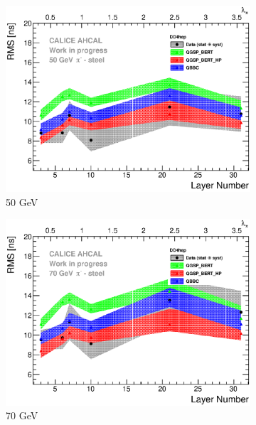 \begin{figure}[htbp!]
  \hfill
  \begin{subfigure}[t]{0.49\textwidth}
    \centering
    \includegraphics[width=1\textwidth]{../Thesis_Plots/Timing/Pions/Plots/ComparisonToSim/RMS_Depth_50GeV_DD4hep.eps}
    \caption{50 GeV}\label{fig:Depth_RMS_SimData_50GeV_DD4hep}
  \end{subfigure}
  \hfill
  \begin{subfigure}[t]{0.49\textwidth}
    \centering
    \includegraphics[width=1\textwidth]{../Thesis_Plots/Timing/Pions/Plots/ComparisonToSim/RMS_Depth_70GeV_DD4hep.eps}
    \caption{70 GeV}\label{fig:Depth_RMS_SimData_70GeV_DD4hep}
  \end{subfigure}
  \hfill
  \begin{subfigure}[t]{0.49\textwidth}

\end{subfigure}
\end{figure}

